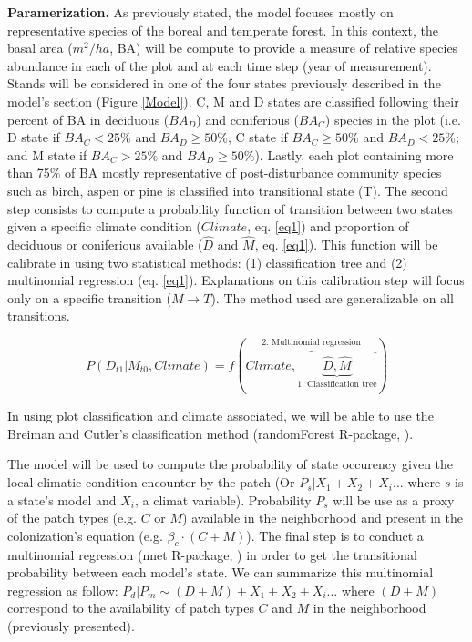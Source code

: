 \textbf{Paramerization.} As previously stated, the model focuses mostly on
representative species of the boreal and temperate forest. In this context,
the basal area ($m^2/ha$, BA) will be compute to provide a measure of relative
species abundance in each of the plot and at each time step (year of
measurement). Stands will be considered in one of the four states previously
described in the model's section (Figure \ref{Model}). C, M and D states are
classified following their percent of BA in deciduous ($BA_D$) and coniferious
($BA_C$) species in the plot (i.e. D state if $BA_C < 25\%$ and $BA_D \geq
50\%$, C state if $BA_C \geq 50\%$ and $BA_D < 25\%$; and M state if $BA_C >
25\%$ and $BA_D \geq 50\%$). Lastly, each plot containing more than 75\% of BA
mostly representative of post-disturbance community species such as birch,
aspen or pine is classified into transitional state (T). The second step
consists to compute a probability function of transition between two states
given a specific climate condition ($Climate$, eq. \ref{eq1}) and proportion
of deciduous or coniferious available ($\hat{D}$ and $\hat{M}$, eq.
\ref{eq1}). This function will be calibrate in using two statistical methods:
(1) classification tree and (2) multinomial regression (eq. \ref{eq1}).
Explanations on this calibration step will focus only on a specific transition
($M \rightarrow T$). The method used are generalizable on all transitions.

\vspace{-1em}
\begin{equation}
	P(D_{t1}|M_{t0}, Climate) = f(\overbrace{Climate, \underbrace{\hat{D}, \hat{M}}_\text{1. Classification tree}}^\text{2. Multinomial regression})
\label{eq1}
\end{equation}


In using plot classification and climate associated, we
will be able to use the Breiman and Cutler's classification method
(randomForest R-package, \cite{Liaw2002a}).

%

The model will be used to compute the probability of state occurency given the
local climatic condition encounter by the patch (Or $P_{s}|X_1+X_2+X_i...$
where $s$ is a state's model and $X_i$, a climat variable). Probability $P_s$
will be use as a proxy of the patch types (e.g. $C$ or $M$) available in the
neighborhood and present in the colonization's equation (e.g. $\beta_c \cdot
(C+M)$). The final step is to conduct a multinomial regression (nnet
R-package, \cite{Venables2002}) in order to get the transitional probability
between each model's state. We can summarize this multinomial regression as
follow: $P_{d}|P_{m} \sim (D+M) + X_1+X_2+X_i... $ where $(D+M)$ correspond to
the availability of patch types $C$ and $M$ in the neighborhood (previously
presented).\\


